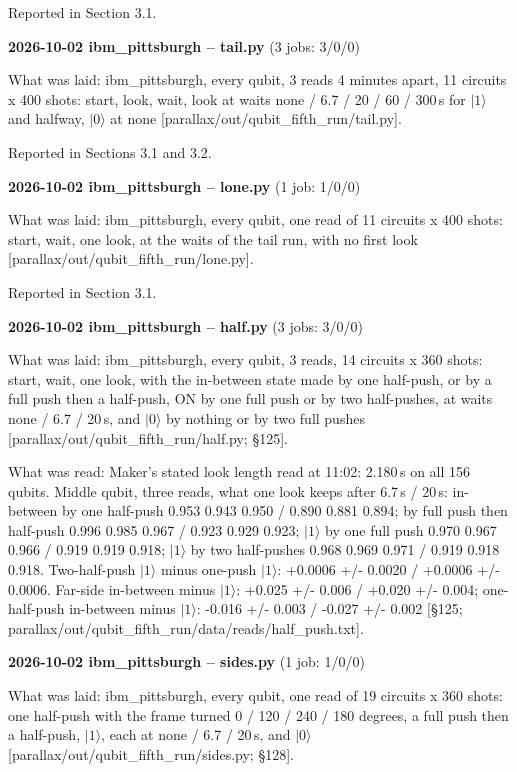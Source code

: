 \documentclass[11pt]{article}
\begin{document}
Reported in Section 3.1.

\textbf{2026-10-02 ibm\_pittsburgh -- tail.py} (3 jobs: 3/0/0)

What was laid: ibm\_pittsburgh, every qubit, 3 reads 4 minutes apart, 11 circuits x 400 shots: start, look, wait, look at waits none / 6.7 / 20 / 60 / 300\,\textmu s for \(|1\rangle\) and halfway, \(|0\rangle\) at none {[}parallax/out/qubit\_fifth\_run/tail.py{]}.

Reported in Sections 3.1 and 3.2.

\textbf{2026-10-02 ibm\_pittsburgh -- lone.py} (1 job: 1/0/0)

What was laid: ibm\_pittsburgh, every qubit, one read of 11 circuits x 400 shots: start, wait, one look, at the waits of the tail run, with no first look {[}parallax/out/qubit\_fifth\_run/lone.py{]}.

Reported in Section 3.1.

\textbf{2026-10-02 ibm\_pittsburgh -- half.py} (3 jobs: 3/0/0)

What was laid: ibm\_pittsburgh, every qubit, 3 reads, 14 circuits x 360 shots: start, wait, one look, with the in-between state made by one half-push, or by a full push then a half-push, ON by one full push or by two half-pushes, at waits none / 6.7 / 20\,\textmu s, and \(|0\rangle\) by nothing or by two full pushes {[}parallax/out/qubit\_fifth\_run/half.py; \S{}125{]}.

What was read: Maker's stated look length read at 11:02: 2.180\,\textmu s on all 156 qubits. Middle qubit, three reads, what one look keeps after 6.7\,\textmu s / 20\,\textmu s: in-between by one half-push 0.953 0.943 0.950 / 0.890 0.881 0.894; by full push then half-push 0.996 0.985 0.967 / 0.923 0.929 0.923; \(|1\rangle\) by one full push 0.970 0.967 0.966 / 0.919 0.919 0.918; \(|1\rangle\) by two half-pushes 0.968 0.969 0.971 / 0.919 0.918 0.918. Two-half-push \(|1\rangle\) minus one-push \(|1\rangle\): +0.0006 +/- 0.0020 / +0.0006 +/- 0.0006. Far-side in-between minus \(|1\rangle\): +0.025 +/- 0.006 / +0.020 +/- 0.004; one-half-push in-between minus \(|1\rangle\): -0.016 +/- 0.003 / -0.027 +/- 0.002 {[}\S{}125; parallax/out/qubit\_fifth\_run/data/reads/half\_push.txt{]}.

\textbf{2026-10-02 ibm\_pittsburgh -- sides.py} (1 job: 1/0/0)

What was laid: ibm\_pittsburgh, every qubit, one read of 19 circuits x 360 shots: one half-push with the frame turned 0 / 120 / 240 / 180 degrees, a full push then a half-push, \(|1\rangle\), each at none / 6.7 / 20\,\textmu s, and \(|0\rangle\) {[}parallax/out/qubit\_fifth\_run/sides.py; \S{}128{]}.
\end{document}
